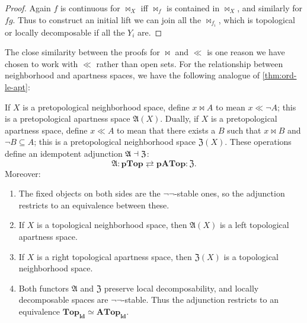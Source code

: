 \documentclass{article}
\def\cpl#1{\neg #1}
\def\anti{\mathfrak{A}}
\def\neigh{\mathfrak{Z}}
\def\nn{\ensuremath{\neg\neg}}
\def\PTop{\mathbf{pTop}}
\def\ldTop{\mathbf{Top}_{\mathbf{ld}}}
\def\PATop{\mathbf{pATop}}
\def\ldATop{\mathbf{ATop}_{\mathbf{ld}}}
\begin{document}
\begin{proof}
  Again $f$ is continuous for $\bowtie_X$ iff $\bowtie_f$ is contained in $\bowtie_X$, and similarly for $f g$.
  Thus to construct an initial lift we can join all the $\bowtie_{f_i}$, which is topological or locally decomposable if all the $Y_i$ are.
\end{proof}

The close similarity between the proofs for $\bowtie$ and $\ll$ is one reason we have chosen to work with $\ll$ rather than open sets.
For the relationship between neighborhood and apartness spaces, we have the following analogue of \cref{thm:ord-le-apt}:

\begin{thm}\label{thm:top-ll-bowtie}
  If $X$ is a pretopological neighborhood space, define $x\bowtie A$ to mean $x\ll \cpl{A}$; this is a pretopological apartness space $\anti(X)$.
  Dually, if $X$ is a pretopological apartness space, define $x\ll A$ to mean that there exists a $B$ such that $x\bowtie B$ and $\cpl{B}\subseteq A$; this is a pretopological neighborhood space $\neigh(X)$.
  These operations define an idempotent adjunction $\anti\adj \neigh$:
  \[ \anti : \PTop \rightleftarrows \PATop : \neigh. \]
  Moreover:
  \begin{enumerate}
  \item The fixed objects on both sides are the \nn-stable ones, so the adjunction restricts to an equivalence between these.
  \item If $X$ is a topological neighborhood space, then $\anti(X)$ is a left topological apartness space.
  \item If $X$ is a right topological apartness space, then $\neigh(X)$ is a topological neighborhood space.
  \item Both functors $\anti$ and $\neigh$ preserve local decomposability, and locally decomposable spaces are \nn-stable.
    Thus the adjunction restricts to an equivalence $\ldTop \simeq \ldATop$.
    \label{item:top-ll-bowtie-equiv}
  \end{enumerate}
\end{thm}
\end{document}
